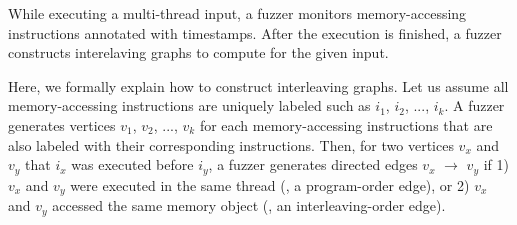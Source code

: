 %


%



%
While executing a multi-thread input, a fuzzer monitors
memory-accessing instructions annotated with timestamps. After the
execution is finished, a fuzzer constructs interelaving graphs to
compute \intcov for the given input.
%


Here, we formally explain how to construct interleaving graphs. Let us
assume all memory-accessing instructions are uniquely labeled such as
$i_1$, $i_2$, ..., $i_k$.
%
A fuzzer generates vertices $v_1$, $v_2$, ..., $v_k$ for each
memory-accessing instructions that are also labeled with their
corresponding instructions.
%
Then, for two vertices $v_x$ and $v_y$ that $i_x$ was executed before
$i_y$, a fuzzer generates directed edges $v_x$ $\rightarrow$ $v_y$ if
1) $v_x$ and $v_y$ were executed in the same thread (\ie, a
program-order edge), or 2) $v_x$ and $v_y$ accessed the same memory
object (\ie, an interleaving-order edge).




